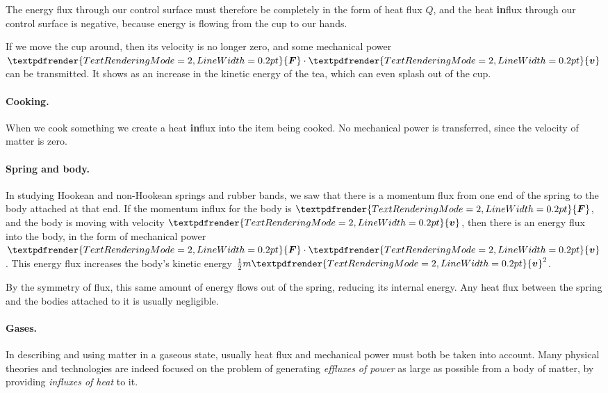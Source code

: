 \documentclass[a4paper,12pt,%
onecolumn,oneside,%
british%
]{memoir}
\renewcommand*{\bm}[1]{\textpdfrender{TextRenderingMode=2,LineWidth=0.2pt}{\boldsymbol{#1}}}
\renewcommand*{\|}[1][]{\nonscript\:#1\vert\nonscript\:\mathopen{}}
\newcommand*{\yv}{\bm{v}}
\newcommand*{\yM}{m}%
\newcommand*{\yQ}{Q}%
\newcommand*{\yF}{\bm{F}}
\begin{document}
The energy flux through our control surface must therefore be completely in the form of heat flux $\yQ$, and the heat \textbf{in}flux through our control surface is negative, because energy is flowing from the cup to our hands.

If we move the cup around, then its velocity is no longer zero, and some mechanical power $\yF\cdot\yv$ can be transmitted. It shows as an increase in the kinetic energy of the tea, which can even splash out of the cup.

\paragraph{Cooking.}
When we cook something we create a heat \textbf{in}flux into the item being cooked. No mechanical power is transferred, since the velocity of matter is zero.

\paragraph{Spring and body.}
In studying Hookean and non-Hookean springs and rubber bands, we saw that there is a momentum flux from one end of the spring to the body attached at that end. If the momentum influx for the body is $\yF$, and the body is moving with velocity $\yv$, then there is an energy flux into the body, in the form of mechanical power $\yF\cdot \yv$. This energy flux increases the body's kinetic energy $\tfrac12\yM\yv^{2}$.

By the symmetry of flux, this same amount of energy flows out of the spring, reducing its internal energy. Any heat flux between the spring and the bodies attached to it is usually negligible.

\paragraph{Gases.}

In describing and using matter in a gaseous state, usually heat flux and mechanical power must both be taken into account. Many physical theories and technologies are indeed focused on the problem of generating \emph{effluxes of power} as large as possible from a body of matter, by providing \emph{influxes of heat} to it.
\end{document}
